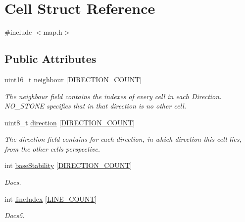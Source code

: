 \hypertarget{struct_cell}{}\section{Cell Struct Reference}
\label{struct_cell}


{\ttfamily \#include $<$map.\+h$>$}

\subsection*{Public Attributes}
\begin{DoxyCompactItemize}
\item 
uint16\+\_\+t \hyperlink{struct_cell_a6d07727f0c63d9a3eea3c74ffe0ecfd6}{neighbour} \mbox{[}\hyperlink{map_8h_a2ef64e8f493930946d7b7fd03eca27c9}{D\+I\+R\+E\+C\+T\+I\+O\+N\+\_\+\+C\+O\+U\+NT}\mbox{]}
\begin{DoxyCompactList}\small\item\em The neighbour field contains the indexes of every cell in each Direction. N\+O\+\_\+\+S\+T\+O\+NE specifies that in that direction is no other cell. \end{DoxyCompactList}\item 
uint8\+\_\+t \hyperlink{struct_cell_ad0ce5702eaa1faa24636c1cd83e3a893}{direction} \mbox{[}\hyperlink{map_8h_a2ef64e8f493930946d7b7fd03eca27c9}{D\+I\+R\+E\+C\+T\+I\+O\+N\+\_\+\+C\+O\+U\+NT}\mbox{]}
\begin{DoxyCompactList}\small\item\em The direction field contains for each direction, in which direction this cell lies, from the other cell\textquotesingle{}s perspective. \end{DoxyCompactList}\item 
int \hyperlink{struct_cell_aef7fab76ea099cc4a78a1500eb58b0c1}{base\+Stability} \mbox{[}\hyperlink{map_8h_a2ef64e8f493930946d7b7fd03eca27c9}{D\+I\+R\+E\+C\+T\+I\+O\+N\+\_\+\+C\+O\+U\+NT}\mbox{]}
\begin{DoxyCompactList}\small\item\em Docs. \end{DoxyCompactList}\item 
int \hyperlink{struct_cell_a0cfd0294fd5bd630a481dd191bf2c92d}{line\+Index} \mbox{[}\hyperlink{map_8h_ac55830607aac38b90f4fe35fc43c7880}{L\+I\+N\+E\+\_\+\+C\+O\+U\+NT}\mbox{]}
\begin{DoxyCompactList}\small\item\em Docs5. \end{DoxyCompactList}\end{DoxyCompactItemize}


